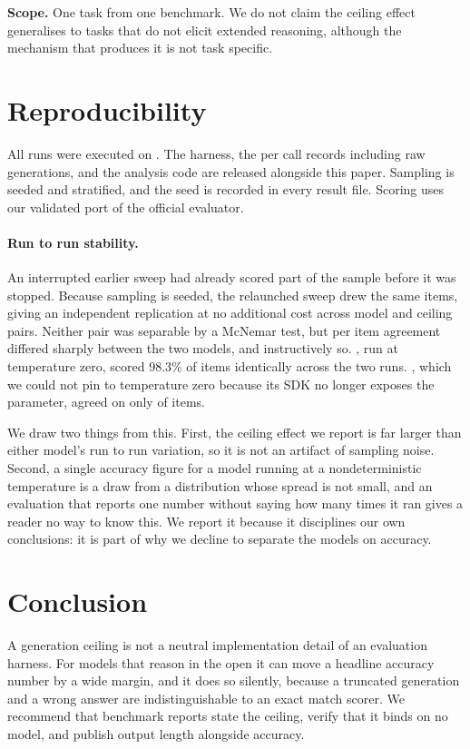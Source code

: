 \documentclass[10pt,twocolumn]{article}
\begin{document}
\textbf{Scope.} One task from one benchmark. We do not claim the ceiling effect
generalises to tasks that do not elicit extended reasoning, although the
mechanism that produces it is not task specific.

\section{Reproducibility}
\label{sec:repro}

All runs were executed on \runDate{}. The harness, the per call records
including raw generations, and the analysis code are released alongside this
paper. Sampling is seeded and stratified, and the seed is recorded in every
result file. Scoring uses our validated port of the official evaluator.

\paragraph{Run to run stability.} An interrupted earlier sweep had already
scored part of the sample before it was stopped. Because sampling is seeded, the
relaunched sweep drew the same items, giving an independent replication at no
additional cost across \replPairs{} model and ceiling pairs. Neither pair was
separable by a McNemar test, but per item agreement differed sharply between the
two models, and instructively so. \nemotronName{}, run at temperature zero,
scored 98.3\% of items identically across the two runs. \claudeName{}, which we
could not pin to temperature zero because its SDK no longer exposes the
parameter, agreed on only \replWorstAgree{} of items.

We draw two things from this. First, the ceiling effect we report is far larger
than either model's run to run variation, so it is not an artifact of sampling
noise. Second, a single accuracy figure for a model running at a nondeterministic
temperature is a draw from a distribution whose spread is not small, and an
evaluation that reports one number without saying how many times it ran gives a
reader no way to know this. We report it because it disciplines our own
conclusions: it is part of why we decline to separate the models on accuracy.

\section{Conclusion}

A generation ceiling is not a neutral implementation detail of an evaluation
harness. For models that reason in the open it can move a headline accuracy
number by a wide margin, and it does so silently, because a truncated generation
and a wrong answer are indistinguishable to an exact match scorer. We recommend
that benchmark reports state the ceiling, verify that it binds on no model, and
publish output length alongside accuracy.



\end{document}
